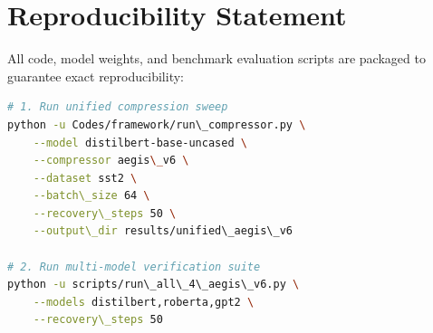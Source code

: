 \section{Reproducibility Statement}
All code, model weights, and benchmark evaluation scripts are packaged to guarantee exact reproducibility:
\begin{lstlisting}[language=bash]
# 1. Run unified compression sweep
python -u Codes/framework/run\_compressor.py \
    --model distilbert-base-uncased \
    --compressor aegis\_v6 \
    --dataset sst2 \
    --batch\_size 64 \
    --recovery\_steps 50 \
    --output\_dir results/unified\_aegis\_v6

# 2. Run multi-model verification suite
python -u scripts/run\_all\_4\_aegis\_v6.py \
    --models distilbert,roberta,gpt2 \
    --recovery\_steps 50
\end{lstlisting}
